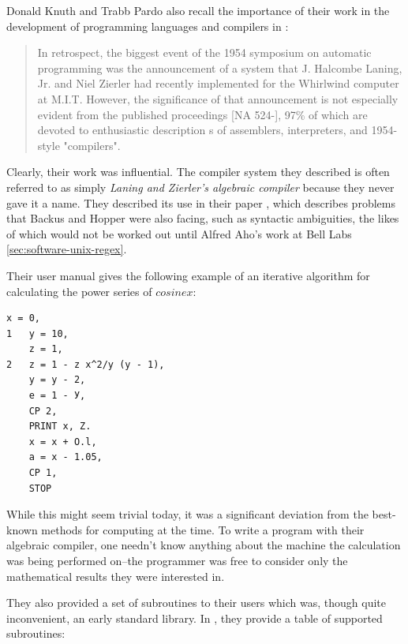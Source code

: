 Donald Knuth and Trabb Pardo also recall the importance of their work in
the development of programming languages and compilers
in :

\begin{quotation}
	In retrospect, the biggest event of the 1954 symposium on automatic
	programming was the announcement of a system that J. Halcombe Laning, Jr. and Niel Zierler
	had recently implemented for the Whirlwind computer at M.I.T.  However, the
	significance of that announcement is not especially evident from the published
	proceedings [NA 524-], 97\% of which are devoted to enthusiastic description s
	of assemblers, interpreters, and 1954-style "compilers".
\end{quotation}

Clearly, their work was influential.
The compiler system they described is often referred to as simply
\textit{Laning and Zierler's algebraic compiler}
because they never gave it a name.
They described its use in their paper ,
which describes problems that Backus and Hopper were also facing, such as syntactic ambiguities,
the likes of which would not be worked out until Alfred Aho's work at Bell Labs
\ref{sec:software-unix-regex}.

Their user manual gives the following example of an iterative algorithm for
calculating the power series of $cosine x$:

\begin{lstlisting}[frame=single]
    x = 0,
1   y = 10,
    z = 1,
2   z = 1 - z x^2/y (y - 1),
    y = y - 2,
    e = 1 - У,
    CP 2,
    PRINT x, Z.
    x = x + O.l,
    a = x - 1.05,
    CP 1,
    STOP
\end{lstlisting}

While this might seem trivial today, it was a significant deviation from the
best-known methods for computing at the time. To write a program with their algebraic
compiler, one needn't know anything about the machine the calculation was being performed on--the
programmer was free to consider only the mathematical results they were interested in.

They also provided a set of subroutines to their users which was, though quite inconvenient,
an early standard library.
In \cite[Section 11. Function Subroutines]{laning_zierler_algebraic_compiler_manual_1954},
they provide a table of supported subroutines:

